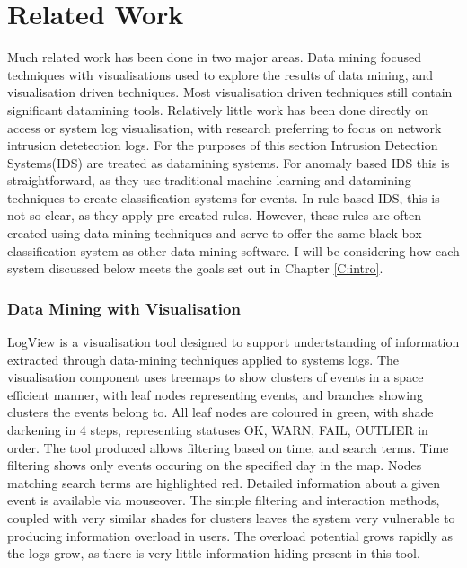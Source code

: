 \chapter{Related Work}\label{C:back}

Much related work has been done in two major areas. Data mining focused techniques with visualisations used to explore the results of data mining, and visualisation driven techniques. Most visualisation driven techniques still contain significant datamining tools. Relatively little work has been done directly on access or system log visualisation, with research preferring to focus on network intrusion detetection logs. For the purposes of this section Intrusion Detection Systems(IDS) are treated as datamining systems. For anomaly based IDS this is straightforward, as they use traditional machine learning and datamining techniques to create classification systems for events. In rule based IDS, this is not so clear, as they apply pre-created rules. However, these rules are often created using data-mining techniques and serve to offer the same black box classification system as other data-mining software. I will be considering how each system discussed below meets the goals set out in Chapter \ref{C:intro}.

\subsection{Data Mining with Visualisation}

LogView \cite{4641277} is a visualisation tool designed to support undertstanding of information extracted through data-mining techniques applied to systems logs. The visualisation component uses treemaps to show clusters of events in a space efficient manner, with leaf nodes representing events, and branches showing clusters the events belong to. All leaf nodes are coloured in green, with shade darkening in 4 steps, representing  statuses OK, WARN, FAIL, OUTLIER in order.  The tool produced allows filtering based on time, and search terms. Time filtering shows only events occuring on the specified day in the map. Nodes matching search terms are highlighted red. Detailed information about a given event is available via mouseover. The simple filtering and interaction methods, coupled with very similar shades for clusters leaves the system very vulnerable to producing information overload in users. The overload potential grows rapidly as the logs grow, as there is very little information hiding present in this tool. 

